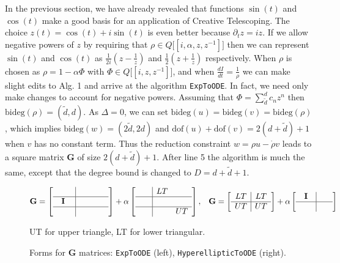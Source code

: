 \documentclass[nofootinbib,preprint]{revtex4-1}
\begin{document}
In the previous section, we have already revealed that functions $\sin(t)$ and $\cos(t)$ make 
a good basis for an application of Creative Telescoping. The choice $z(t)= \cos(t)+i \sin(t)$ 
is even better because $\partial_t z = i z$. If we allow negative powers of $z$ by requiring
that ${\rho \in Q\mathbb[\![i,\alpha,z,z^{-1}]\!]}$ then we can represent $\sin(t)$ and 
$\cos(t)$ as $\frac{1}{2i}(z-\frac{1}{z})$ and $\frac{1}{2}(z+\frac{1}{z})$ respectively.
When $\rho$ is chosen as $\rho = 1-\alpha \Phi$ with $\Phi \in Q\mathbb[\![i,z,z^{-1}]\!]$,
and when $\frac{dI}{dt}=\frac{1}{\rho}$ we can make slight edits to Alg. 1 and arrive at 
the algorithm \texttt{ExpToODE}. In fact, we need only make changes to account for negative 
powers. Assuming that $\Phi=\sum_{\tilde{d}}^{d}c_n z^n$ then $\text{bideg}(\rho)=(\tilde{d},d)$. 
As $\Delta=0$, we can set $\text{bideg}(u)=\text{bideg}(v)=\text{bideg}(\rho)$,
which implies $\text{bideg}(w)=(2\tilde{d},2d)$
and $\text{dof}(u)+\text{dof}(v)=2(d+\tilde{d})+1$ when $v$ has no constant term. Thus 
the reduction constraint $w=\rho u -\dot{\rho}v$ leads to a square matrix $\mathbf{G}$
of size $2(d+\tilde{d})+1$. After line 5 the algorithm is much the same, except that 
the degree bound is changed to $D=d+\tilde{d}+1$.

\newpage
\begin{figure}[t]
$\mathbf{G}=\begin{bmatrix}
\begin{array}{c  |c c }
   &  \phantom{\;0\;}  & \phantom{\;0\;}  \\
\hline
    \;\; \mathbf{I} \;\;\;   &   &   \\
\hline   
     &   &   
\end{array}
\end{bmatrix}
+\alpha \begin{bmatrix}
\begin{array}{c |c c }
  \phantom{\;x\;}  &  LT &   \\
\hline
   &      & \\
\hline   
   &     &   UT
\end{array}
\end{bmatrix},
\;\;\;
\mathbf{G}=
\begin{bmatrix}
\begin{array}{c |c c }
  LT &  LT   \\
\hline
 UT  &     UT 
\end{array}
\end{bmatrix}
+\alpha \begin{bmatrix}
\begin{array}{c  |c  }
 \mathbf{\;\;I\;\;}  & \phantom{\;0\;}    \\
\hline
     & 
\end{array}
\end{bmatrix}$
\begin{center}
UT for upper triangle, LT for lower triangular.
\end{center}
\label{fig:gmatrices}
\caption{Forms for $\mathbf{G}$ matrices: \texttt{ExpToODE} (left), \texttt{HyperellipticToODE} (right).}
\end{figure}
\end{document}
